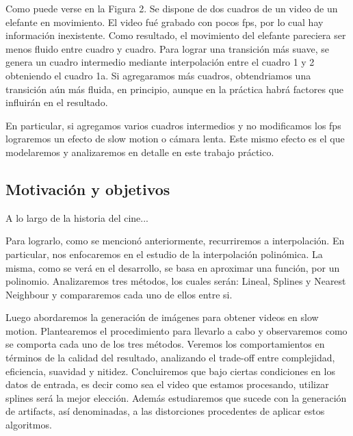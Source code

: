 Como puede verse en la Figura 2. Se dispone de dos cuadros de un video de un elefante en movimiento. El video fué grabado con pocos fps, por lo cual hay información inexistente. Como resultado, el movimiento del elefante pareciera ser menos fluido entre cuadro y cuadro. Para lograr una transición más suave, se genera un cuadro intermedio mediante interpolación entre el cuadro 1 y 2 obteniendo el cuadro 1a. Si agregaramos más cuadros, obtendriamos una transición aún más fluida, en principio, aunque en la práctica habrá factores que influirán en el resultado. 

En particular, si agregamos varios cuadros intermedios y no modificamos los fps lograremos un efecto de slow motion o cámara lenta. Este mismo efecto es el que modelaremos y analizaremos en detalle en este trabajo práctico.

\subsection{Motivación y objetivos}

A lo largo de la historia del cine... 

Para lograrlo, como se mencionó anteriormente, recurriremos a interpolación.
En particular, nos enfocaremos en el estudio de la interpolación polinómica. 
La misma, como se verá en el desarrollo, se basa en aproximar una función, por un polinomio. Analizaremos tres métodos, los cuales serán:  Lineal, Splines y Nearest Neighbour y compararemos cada uno de ellos entre si.

Luego abordaremos la generación de imágenes para obtener videos en slow motion.
Plantearemos el procedimiento para llevarlo a cabo y observaremos como se comporta cada uno de los tres métodos. Veremos los comportamientos en términos de la calidad del resultado, analizando el trade-off entre complejidad, eficiencia, suavidad y nitidez. Concluiremos que bajo ciertas condiciones en los datos de entrada, es decir como sea el video que estamos procesando, utilizar splines será la mejor elección. 
Además estudiaremos que sucede con la generación de artifacts, así denominadas, a las distorciones procedentes de aplicar estos algoritmos.